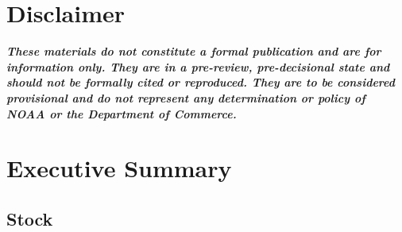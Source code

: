 \documentclass[11pt,
  english,
  a4paper,
]{article}
\begin{document}
\newcommand{\lt}{\ensuremath <}
\newcommand{\gt}{\ensuremath >}

\vspace{500cm}


\hypertarget{disclaimer}{%
\section*{Disclaimer}\label{disclaimer}}

\leavevmode\tagmcend\tagstructend


\emph{\textbf{These materials do not constitute a formal publication and are for information only. They are in a pre-review, pre-decisional state and should not be formally cited or reproduced. They are to be considered provisional and do not represent any determination or policy of NOAA or the Department of Commerce.}}

\leavevmode\tagmcend\tagstructend\par

\pagebreak
{}
\setcounter{page}{1}

\renewcommand{\thetable}{\roman{table}}
\renewcommand{\thefigure}{\roman{figure}}

\setlength\parskip{0.5em plus 0.1em minus 0.2em}


\hypertarget{executive-summary}{%
\section*{Executive Summary}\label{executive-summary}}

\leavevmode\tagmcend\tagstructend


\hypertarget{stock}{%
\subsection*{Stock}\label{stock}}

\leavevmode\tagmcend\tagstructend

\end{document}
